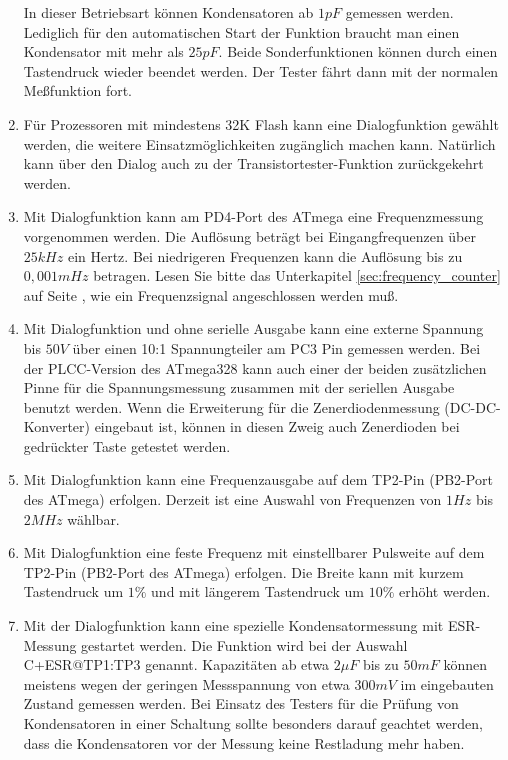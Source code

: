 \begin{enumerate}
In dieser Betriebsart können Kondensatoren ab \(1pF\) gemessen werden. Lediglich für den automatischen Start der Funktion
braucht man einen Kondensator mit mehr als \(25pF\).
Beide Sonderfunktionen können durch einen Tastendruck wieder beendet werden. Der Tester fährt dann mit der normalen
Meßfunktion fort.
\item Für Prozessoren mit mindestens 32K Flash kann eine Dialogfunktion gewählt werden, 
die weitere Einsatzmöglichkeiten zugänglich machen kann.
Natürlich kann über den Dialog auch zu der Transistortester-Funktion zurückgekehrt werden.
\item Mit Dialogfunktion kann am PD4-Port des ATmega eine Frequenzmessung vorgenommen werden.
Die Auflösung beträgt bei Eingangfrequenzen über \(25kHz\) ein Hertz.
Bei niedrigeren Frequenzen kann die Auflösung bis zu \(0,001mHz\) betragen.
Lesen Sie bitte das Unterkapitel \ref{sec:frequency_counter} auf Seite \pageref{sec:frequency_counter},
wie ein Frequenzsignal angeschlossen werden muß.
\item Mit Dialogfunktion und ohne serielle Ausgabe kann eine externe Spannung bis \(50V\) über einen
10:1 Spannungteiler am PC3 Pin gemessen werden. Bei der PLCC-Version des ATmega328 kann auch einer der beiden
zusätzlichen Pinne für die Spannungsmessung zusammen mit der seriellen Ausgabe benutzt werden.
Wenn die Erweiterung für die Zenerdiodenmessung (DC-DC-Konverter)
eingebaut ist, können in diesen Zweig auch Zenerdioden bei gedrückter Taste getestet werden.
\item Mit Dialogfunktion kann eine Frequenzausgabe auf dem TP2-Pin (PB2-Port des ATmega) erfolgen.
Derzeit ist eine Auswahl von Frequenzen von \(1Hz\) bis \(2MHz\) wählbar.
\item Mit Dialogfunktion eine feste Frequenz mit einstellbarer Pulsweite auf dem TP2-Pin (PB2-Port des ATmega) erfolgen.
Die Breite kann mit kurzem Tastendruck um \(1\%\) und mit längerem Tastendruck um \(10\%\) erhöht werden.
\item Mit der Dialogfunktion kann eine spezielle Kondensatormessung mit ESR-Messung gestartet werden.
Die Funktion wird bei der Auswahl \mbox{C+ESR@TP1:TP3} genannt.
 Kapazitäten ab etwa \(2\mu F\) bis zu \(50mF\) können meistens wegen der geringen Messspannung von etwa \(300mV\)
 im eingebauten Zustand gemessen werden.
 Bei Einsatz des Testers für die Prüfung von Kondensatoren in einer Schaltung sollte besonders darauf geachtet werden,
 dass die Kondensatoren vor der Messung keine Restladung mehr haben.

\end{enumerate}

